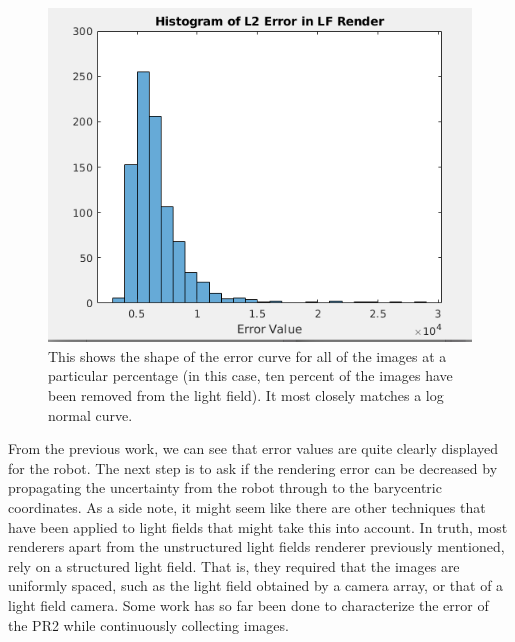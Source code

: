 \documentclass[12pt]{report}
\begin{document}
\begin{figure}[!ht]
	\centering
	\includegraphics[scale=0.50]{l2_error.png}
	\caption{This shows the shape of the error curve for all of the images at a particular percentage (in this case, ten percent of the images have been removed from the light field). It most closely matches a log normal curve.}
	\label{fig:l2_error}
\end{figure}

From the previous work, we can see that error values are quite clearly displayed for the robot. The next step is to ask if the rendering error can be decreased by propagating the uncertainty from the robot through to the barycentric coordinates. As a side note, it might seem like there are other techniques that have been applied to light fields that might take this into account. In truth, most renderers apart from the unstructured light fields renderer previously mentioned, rely on a structured light field. That is, they required that the images are uniformly spaced, such as the light field obtained by a camera array, or that of a light field camera. Some work has so far been done to characterize the error of the PR2 while continuously collecting images.
\end{document}
